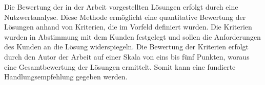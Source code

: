 Die Bewertung der in der Arbeit vorgestellten Lösungen erfolgt durch eine Nutzwertanalyse. Diese Methode ermöglicht eine quantitative Bewertung der Lösungen anhand von Kriterien, die im Vorfeld definiert wurden. Die Kriterien wurden in Abstimmung mit dem Kunden festgelegt und sollen die Anforderungen des Kunden an die Lösung widerspiegeln. Die Bewertung der Kriterien erfolgt durch den Autor der Arbeit auf einer Skala von eins bis fünf Punkten, woraus eine Gesamtbewertung der Lösungen ermittelt. Somit kann eine fundierte Handlungsempfehlung gegeben werden.